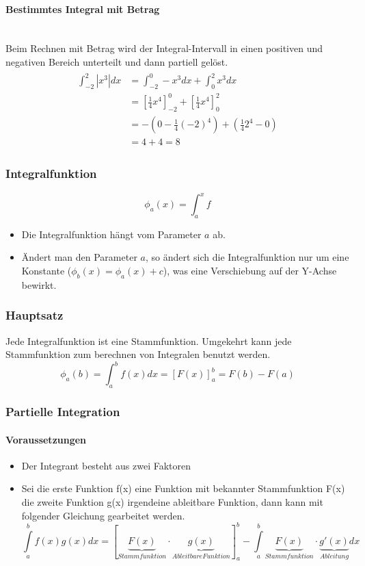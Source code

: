 \paragraph{Bestimmtes Integral mit Betrag} \hfill \\
Beim Rechnen mit Betrag wird der Integral-Intervall in einen positiven und negativen Bereich unterteilt und dann partiell gelöst.
\begin{align}
\begin{split}
\int_{-2}^{2} |x^3| dx &= \int_{-2}^{0} -x^3 dx + \int_{0}^{2} x^3 dx \\
&= \left[\frac{1}{4}x^4 \right]_{-2}^{0} + \left[\frac{1}{4}x^4 \right]_{0}^{2} \\
&= -(0 - \frac{1}{4} (-2)^4) + (\frac{1}{4}2^4 - 0) \\
&= 4 + 4 = 8 
\end{split}
\end{align}

\subsubsection{Integralfunktion}
\[ \phi_a(x) = \int_a^x f \]
\begin{itemize}
	\item Die Integralfunktion hängt vom Parameter $a$ ab.
	\item Ändert man den Parameter $a$, so ändert sich die
	Integralfunktion nur um eine Konstante ($\phi_b(x) = \phi_a(x) + c$),
	was eine Verschiebung auf der Y-Achse bewirkt.
\end{itemize}

\subsubsection{Hauptsatz}
Jede Integralfunktion ist eine Stammfunktion. Umgekehrt kann jede
Stammfunktion zum berechnen von Integralen benutzt werden.
\[\phi_a(b) = \int_a^b f(x)dx = [F(x)]^b_a = F(b) - F(a) \]

\subsubsection{Partielle Integration}
\paragraph{Voraussetzungen}
\begin{itemize}
	\item Der Integrant besteht aus zwei Faktoren
	\item Sei die erste Funktion f(x) eine Funktion mit bekannter Stammfunktion F(x) die zweite Funktion g(x) irgendeine ableitbare Funktion, dann kann mit folgender Gleichung gearbeitet werden.
	\[
	\int\limits_{a}^{b} f(x)g(x) dx = 
	\left[ \underbrace{F(x)}_{Stammfunktion} \cdot \underbrace{g(x)}_{Ableitbare Funktion} \right] _a^b
	- \int\limits_{a}^{b} \underbrace{F(x)}_{Stammfunktion} \cdot \underbrace{g'(x)}_{Ableitung}dx
	\]
\end{itemize}
